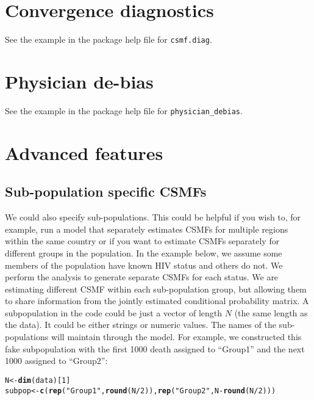 \documentclass{article}\usepackage[]{graphicx}\usepackage[]{color}
\makeatletter
\newcommand{\hlnum}[1]{\textcolor[rgb]{0.686,0.059,0.569}{#1}}%
\newcommand{\hlstr}[1]{\textcolor[rgb]{0.192,0.494,0.8}{#1}}%
\newcommand{\hlopt}[1]{\textcolor[rgb]{0,0,0}{#1}}%
\newcommand{\hlstd}[1]{\textcolor[rgb]{0.345,0.345,0.345}{#1}}%
\newcommand{\hlkwb}[1]{\textcolor[rgb]{0.69,0.353,0.396}{#1}}%
\newcommand{\hlkwd}[1]{\textcolor[rgb]{0.737,0.353,0.396}{\textbf{#1}}}%
\newenvironment{kframe}{%
 \def\at@end@of@kframe{}%
 \ifinner\ifhmode%
  \def\at@end@of@kframe{\end{minipage}}%
  \begin{minipage}{\columnwidth}%
 \fi\fi%
 \def\FrameCommand##1{\hskip\@totalleftmargin \hskip-\fboxsep
 \colorbox{shadecolor}{##1}\hskip-\fboxsep
     \hskip-\linewidth \hskip-\@totalleftmargin \hskip\columnwidth}%
 \MakeFramed {\advance\hsize-\width
   \@totalleftmargin\z@ \linewidth\hsize
   \@setminipage}}%
 {\par\unskip\endMakeFramed%
 \at@end@of@kframe}
\newenvironment{knitrout}{}{} %
\newcommand\code{\bgroup\@makeother\_\@makeother\~\@makeother\$\@codex}
\def\@codex#1{{\normalfont\ttfamily\hyphenchar\font=-1 #1}\egroup}
\let\code=\texttt
\makeatother
\begin{document}
\clearpage
\section{Convergence diagnostics}
See the example in the package help file for \code{csmf.diag}.
\section{Physician de-bias}
See the example in the package help file for \code{physician\_debias}.

\section{Advanced features}
\subsection{Sub-population specific CSMFs}

We could also specify sub-populations. This could be helpful if you wish to, for example, run a model that separately estimates CSMFs for multiple regions within the same country or if you want to estimate CSMFs separately for different groups in the population.  In the example below, we assume some members of the population have known HIV status and others do not.  We perform the analysis to generate separate CSMFs for each status.  We are estimating different CSMF within each sub-population group, but allowing them to share information from the jointly estimated conditional probability matrix. A subpopulation in the code could be just a vector of length $N$ (the same length as the data). It could be either strings or numeric values. The names of the sub-populations will maintain through the model. For example, we constructed this fake subpopulation with the first 1000 death assigned to ``Group1'' and the next 1000 assigned to ``Group2'':
\begin{knitrout}
\color{fgcolor}\begin{kframe}
\begin{alltt}
\hlstd{N} \hlkwb{<-} \hlkwd{dim}\hlstd{(data)[}\hlnum{1}\hlstd{]}
\hlstd{subpop} \hlkwb{<-} \hlkwd{c}\hlstd{(}\hlkwd{rep}\hlstd{(}\hlstr{"Group1"}\hlstd{,} \hlkwd{round}\hlstd{(N}\hlopt{/}\hlnum{2}\hlstd{)),} \hlkwd{rep}\hlstd{(}\hlstr{"Group2"}\hlstd{, N}\hlopt{-}\hlkwd{round}\hlstd{(N}\hlopt{/}\hlnum{2}\hlstd{)))}
\end{alltt}
\end{kframe}
\end{knitrout}
\end{document}
